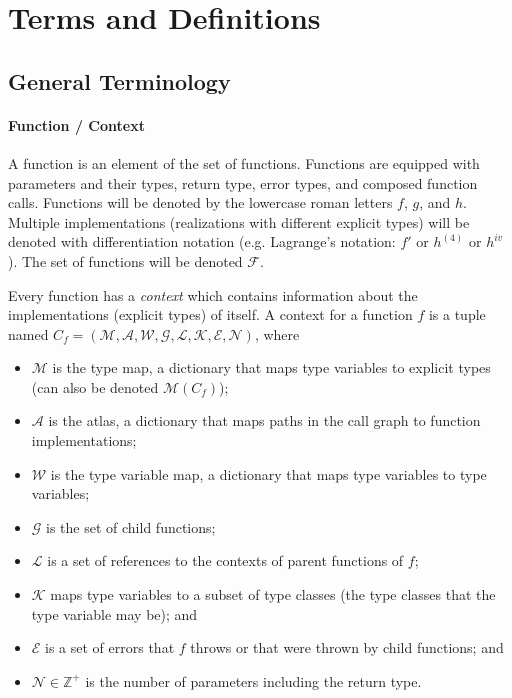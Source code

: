 \documentclass[10pt]{article}
\begin{document}
\pagebreak
\section{Terms and Definitions}

\subsection{General Terminology}
	\paragraph{Function / Context} 
	A function is an element of the set of functions. Functions are equipped
	with parameters and their types, return type, error types, and composed
	function calls.  Functions will be denoted by the lowercase roman letters
	$f$, $g$, and $h$.  Multiple implementations (realizations with different
	explicit types) will be denoted with differentiation notation (e.g.
	Lagrange's notation: $f'$ or $h^{(4)}$ or $h^{iv}$).  The set of functions
	will be denoted $\mathcal{F}$.

	Every function has a \emph{context} which contains information about the
	implementations (explicit types) of itself. A context for a function $f$ is
	a tuple named $C_f = (\mathcal{M}, \mathcal{A}, \mathcal{W}, \mathcal{G},
	\mathcal{L}, \mathcal{K}, \mathcal{E}, \mathcal{N})$, where
	\begin{itemize}[noitemsep]
		\item $\mathcal{M}$ is the type map, a dictionary that maps type
			variables to explicit types (can also be denoted
			$\mathcal{M}(C_f)$);
		\item $\mathcal{A}$ is the atlas, a dictionary that maps paths in the
			call graph to function implementations;
		\item $\mathcal{W}$ is the type variable map, a dictionary that maps
			type variables to type variables;
		\item $\mathcal{G}$ is the set of child functions;
		\item $\mathcal{L}$ is a set of references to the contexts of parent
			functions of $f$;
		\item $\mathcal{K}$ maps type variables to a subset of type classes
			(the type classes that the type variable may be); and
		\item $\mathcal{E}$ is a set of errors that $f$ throws or that were
			thrown by child functions; and
		\item $\mathcal{N} \in \mathbb{Z}^+$ is the number of parameters
			including the return type.
	\end{itemize}
\end{document}

